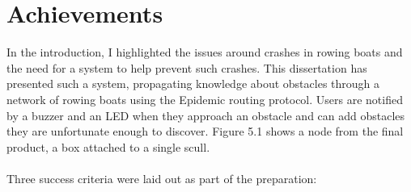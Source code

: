 \documentclass[12pt,a4paper]{report}
\begin{document}
\section{Achievements}
In the introduction, I highlighted the issues around crashes in rowing boats and the need for a system to help prevent such crashes. This dissertation has presented such a system, propagating knowledge about obstacles through a network of rowing boats using the Epidemic routing protocol. Users are notified by a buzzer and an LED when they approach an obstacle and can add obstacles they are unfortunate enough to discover. Figure 5.1 shows a node from the final product, a box attached to a single scull. \\ \\
Three success criteria were laid out as part of the preparation: \\ 
\end{document}
